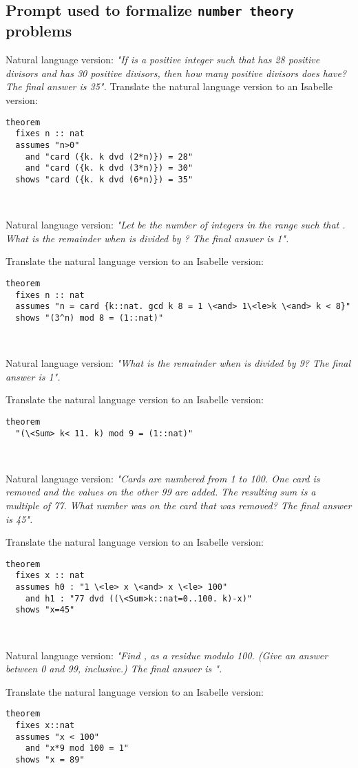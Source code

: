 \documentclass{article}
\begin{document}
\subsection{Prompt used to formalize \texttt{number theory}
 problems}
\label{appendix:prompt_quan_study_number_theory}

\begin{boxB}
Natural language version: \emph{"If  is a positive integer such that  has 28 positive divisors and  has 30 positive divisors, then how many positive divisors does  have? The final answer is 35".} Translate the natural language version to an Isabelle version:

\begin{lstlisting}
theorem
  fixes n :: nat
  assumes "n>0" 
    and "card ({k. k dvd (2*n)}) = 28"
    and "card ({k. k dvd (3*n)}) = 30" 
  shows "card ({k. k dvd (6*n)}) = 35"
\end{lstlisting}
  
\

Natural language version: \emph{"Let  be the number of integers  in the range  such that . What is the remainder when  is divided by ? The final answer is 1".}

Translate the natural language version to an Isabelle version:
\begin{lstlisting}
theorem
  fixes n :: nat
  assumes "n = card {k::nat. gcd k 8 = 1 \<and> 1\<le>k \<and> k < 8}" 
  shows "(3^n) mod 8 = (1::nat)"
\end{lstlisting}

\

Natural language version: \emph{"What is the remainder when  is divided by 9? The final answer is 1".}

Translate the natural language version to an Isabelle version:
\begin{lstlisting}
theorem
  "(\<Sum> k< 11. k) mod 9 = (1::nat)"
\end{lstlisting}

\

Natural language version: \emph{"Cards are numbered from 1 to 100. One card is removed and the values on the other 99 are added. The resulting sum is a multiple of 77. What number was on the card that was removed? The final answer is 45".}

Translate the natural language version to an Isabelle version:
\begin{lstlisting}
theorem
  fixes x :: nat
  assumes h0 : "1 \<le> x \<and> x \<le> 100"
    and h1 : "77 dvd ((\<Sum>k::nat=0..100. k)-x)"
  shows "x=45"
\end{lstlisting}

\

Natural language version: \emph{"Find , as a residue modulo 100.  (Give an answer between 0 and 99, inclusive.) The final answer is ".}

Translate the natural language version to an Isabelle version:

\begin{lstlisting}
theorem
  fixes x::nat
  assumes "x < 100"
    and "x*9 mod 100 = 1" 
  shows "x = 89"
\end{lstlisting}
\end{boxB}
\end{document}
